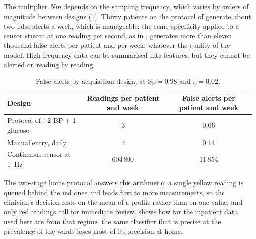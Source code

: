 The multiplier $Nm$ depends on the sampling frequency, which varies by orders of magnitude between designs (\cref{tab:alert-designs}). Thirty patients on the protocol of \textcite{mihevc2025} generate about two false alerts a week, which is manageable; the same specificity applied to a sensor stream at one reading per second, as in \textcite{efendi2025}, generates more than eleven thousand false alerts per patient and per week, whatever the quality of the model. High-frequency data can be summarised into features, but they cannot be alerted on reading by reading.

\begin{table}[htbp]
\centering\small
\caption{False alerts by acquisition design, at $\mathrm{Sp} = 0.98$ and $\pi = 0.02$.}\label{tab:alert-designs}
\begin{tabularx}{\textwidth}{@{}X c c@{}}
\toprule
\textbf{Design} & \textbf{Readings per patient and week} & \textbf{False alerts per patient and week} \\
\midrule
Protocol of \textcite{mihevc2025}: 2 BP + 1 glucose & 3 & 0.06 \\
Manual entry, daily & 7 & 0.14 \\
Continuous sensor at 1~Hz \parencite{efendi2025} & 604\,800 & 11\,854 \\
\bottomrule
\end{tabularx}
\end{table}

The two-stage home protocol answers this arithmetic: a single yellow reading is queued behind the red ones and leads first to more measurements, so the clinician's decision rests on the mean of a profile rather than on one value, and only red readings call for immediate review.  shows how far the inpatient data used here are from that regime: the same classifier that is precise at the prevalence of the wards loses most of its precision at home.

